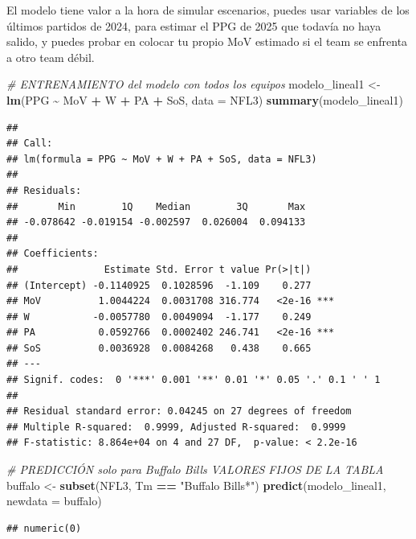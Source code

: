 \documentclass[
]{article}
\newenvironment{Shaded}{\begin{snugshade}}{\end{snugshade}}
\newcommand{\AttributeTok}[1]{\textcolor[rgb]{0.13,0.29,0.53}{#1}}
\newcommand{\CommentTok}[1]{\textcolor[rgb]{0.56,0.35,0.01}{\textit{#1}}}
\newcommand{\FunctionTok}[1]{\textcolor[rgb]{0.13,0.29,0.53}{\textbf{#1}}}
\newcommand{\NormalTok}[1]{#1}
\newcommand{\OtherTok}[1]{\textcolor[rgb]{0.56,0.35,0.01}{#1}}
\newcommand{\SpecialCharTok}[1]{\textcolor[rgb]{0.81,0.36,0.00}{\textbf{#1}}}
\newcommand{\StringTok}[1]{\textcolor[rgb]{0.31,0.60,0.02}{#1}}
\begin{document}
El modelo tiene valor a la hora de simular escenarios, puedes usar
variables de los últimos partidos de 2024, para estimar el PPG de 2025
que todavía no haya salido, y puedes probar en colocar tu propio MoV
estimado si el team se enfrenta a otro team débil.

\begin{Shaded}
\begin{Highlighting}[]
\CommentTok{\# ENTRENAMIENTO del modelo con todos los equipos}
\NormalTok{modelo\_lineal1 }\OtherTok{\textless{}{-}} \FunctionTok{lm}\NormalTok{(PPG }\SpecialCharTok{\textasciitilde{}}\NormalTok{ MoV  }\SpecialCharTok{+}\NormalTok{ W }\SpecialCharTok{+}\NormalTok{ PA }\SpecialCharTok{+}\NormalTok{ SoS, }\AttributeTok{data =}\NormalTok{ NFL3)}
\FunctionTok{summary}\NormalTok{(modelo\_lineal1)}
\end{Highlighting}
\end{Shaded}

\begin{verbatim}
## 
## Call:
## lm(formula = PPG ~ MoV + W + PA + SoS, data = NFL3)
## 
## Residuals:
##       Min        1Q    Median        3Q       Max 
## -0.078642 -0.019154 -0.002597  0.026004  0.094133 
## 
## Coefficients:
##               Estimate Std. Error t value Pr(>|t|)    
## (Intercept) -0.1140925  0.1028596  -1.109    0.277    
## MoV          1.0044224  0.0031708 316.774   <2e-16 ***
## W           -0.0057780  0.0049094  -1.177    0.249    
## PA           0.0592766  0.0002402 246.741   <2e-16 ***
## SoS          0.0036928  0.0084268   0.438    0.665    
## ---
## Signif. codes:  0 '***' 0.001 '**' 0.01 '*' 0.05 '.' 0.1 ' ' 1
## 
## Residual standard error: 0.04245 on 27 degrees of freedom
## Multiple R-squared:  0.9999, Adjusted R-squared:  0.9999 
## F-statistic: 8.864e+04 on 4 and 27 DF,  p-value: < 2.2e-16
\end{verbatim}

\begin{Shaded}
\begin{Highlighting}[]
\CommentTok{\# PREDICCIÓN solo para Buffalo Bills VALORES FIJOS DE LA TABLA}
\NormalTok{buffalo }\OtherTok{\textless{}{-}} \FunctionTok{subset}\NormalTok{(NFL3, Tm }\SpecialCharTok{==} \StringTok{"Buffalo Bills*"}\NormalTok{)}
\FunctionTok{predict}\NormalTok{(modelo\_lineal1, }\AttributeTok{newdata =}\NormalTok{ buffalo)}
\end{Highlighting}
\end{Shaded}

\begin{verbatim}
## numeric(0)
\end{verbatim}
\end{document}
